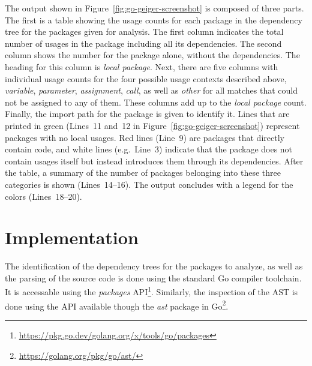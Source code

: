 

The output shown in Figure~\ref{fig:go-geiger-screenshot} is composed of three parts.
The first is a table showing the \unsafe{} usage counts for each package in the dependency tree for the packages
given for analysis.
The first column indicates the total number of usages in the package including all its dependencies.
The second column shows the number for the package alone, without the dependencies.
The heading for this column is \textit{local package}.
Next, there are five columns with individual usage counts for the four possible usage contexts described above,
\textit{variable}, \textit{parameter}, \textit{assignment}, \textit{call}, as well as \textit{other} for all matches
that could not be assigned to any of them.
These columns add up to the \textit{local package} count.
Finally, the import path for the package is given to identify it.
Lines that are printed in green (Lines~11 and~12 in Figure~\ref{fig:go-geiger-screenshot}) represent packages with no
local \unsafe{} usages.
Red lines (Line~9) are packages that directly contain \unsafe{} code, and white lines (e.g.~Line~3) indicate that the
package does not contain \unsafe{} usages itself but instead introduces them through its dependencies.
After the table, a summary of the number of packages belonging into these three categories is shown (Lines~14--16).
The output concludes with a legend for the colors (Lines~18--20).



\section{Implementation}\label{sec:go-geiger:implementation}

The identification of the dependency trees for the packages to analyze, as well as the parsing of the source code is
done using the standard Go compiler toolchain.
It is accessable using the \textit{packages}
\acrshort{API}\footnote{\url{https://pkg.go.dev/golang.org/x/tools/go/packages}}.
Similarly, the inspection of the \acrshort{AST} is done using the \acrshort{API} available though the \textit{ast}
package in Go\footnote{\url{https://golang.org/pkg/go/ast/}}.

